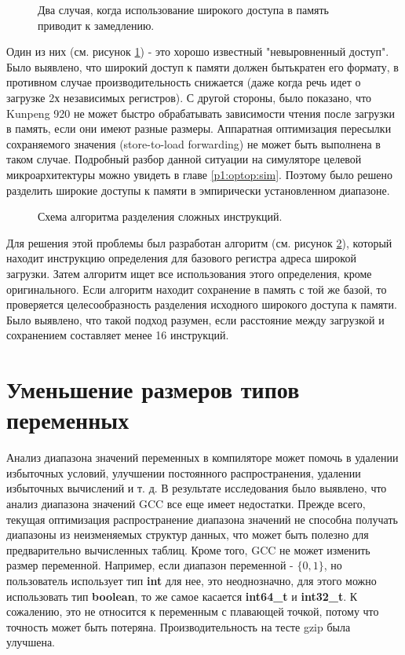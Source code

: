 \begin{figure}[htbp]
	\centering
	
	\caption{Два случая, когда использование широкого доступа в память приводит к замедлению.}
	\label{splitsvg1}
\end{figure}

Один из них (см. рисунок \ref{splitsvg1}) - это хорошо известный "невыровненный доступ". Было выявлено, что широкий доступ к памяти должен бытькратен его формату, в противном случае производительность снижается (даже когда речь идет о загрузке 2х независимых регистров). С другой стороны, было показано, что Kunpeng 920 не может быстро обрабатывать зависимости чтения после загрузки в память, если они имеют разные размеры. Аппаратная оптимизация пересылки сохраняемого значения (store-to-load forwarding) \cite{shen2013modern} не может быть выполнена в таком случае. Подробный разбор данной ситуации на симуляторе целевой микроархитектуры можно увидеть в главе \ref{p1:optop:sim}. Поэтому было решено разделить широкие доступы к памяти в эмпирически установленном диапазоне.



\begin{figure}[htbp]
	\centering
	
	\caption{Схема алгоритма разделения сложных инструкций.}
	\label{splitsvg2}
\end{figure}

Для решения этой проблемы был разработан алгоритм (см. рисунок \ref{splitsvg2}), который находит инструкцию определения для базового регистра адреса широкой загрузки. Затем алгоритм ищет все использования этого определения, кроме оригинального. Если алгоритм находит сохранение в память с той же базой, то проверяется целесообразность разделения исходного широкого доступа к памяти. Было выявлено, что такой подход разумен, если расстояние между загрузкой и сохранением составляет менее 16 инструкций.

 \section {Уменьшение размеров типов переменных}
 Анализ диапазона значений переменных в компиляторе \cite{harrison1977compiler,  simon2008value}  может помочь в удалении избыточных условий, улучшении постоянного распространения, удалении избыточных вычислений и т. д. В результате исследования было выявлено, что анализ диапазона значений GCC все еще имеет недостатки. Прежде всего, текущая оптимизация распространение диапазона значений не способна получать диапазоны из неизменяемых структур данных, что может быть полезно для предварительно вычисленных таблиц. Кроме того, GCC не может изменить размер переменной. Например, если диапазон переменной - $\{0, 1\}$, но пользователь использует тип \textbf{int} для нее, это неоднозначно, для этого можно использовать тип \textbf{boolean}, то же самое касается \textbf{int64\_t} и \textbf{int32\_t}. К сожалению, это не относится к переменным с плавающей точкой, потому что точность может быть потеряна. Производительность на тесте gzip была улучшена.
 
